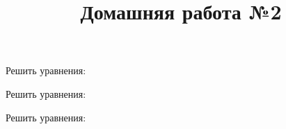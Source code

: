 \newpage
\title{Домашняя работа №2}
\begin{listofex}
	\item Решить уравнения:
	\begin{enumcols}[itemcolumns=1]
		\item {}
		\item {}
		\item {}
		\item {}
		\item {}
		\item {}
	\end{enumcols}
	\item Решить уравнения:
	\begin{enumcols}[itemcolumns=2]
		\item {}
		\item {}
		\item {}
		\item {}
	\end{enumcols}
	\item {}
	\item Решить уравнения:
	\begin{enumcols}[itemcolumns=2]
		\item {}
		\item {}
		\item {}
		\item {}
	\end{enumcols}
\end{listofex}
%	
%	
%	
%	
%	
%	
%	
